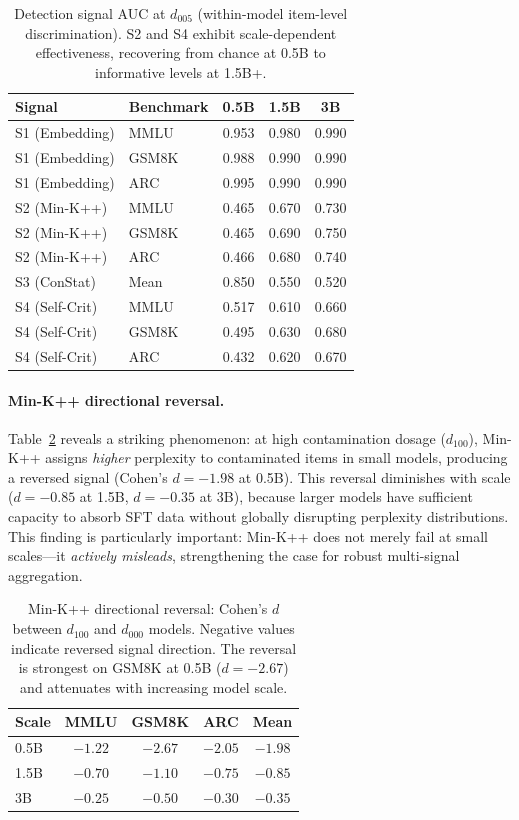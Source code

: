 \documentclass[11pt,a4paper]{article}
\begin{document}
\begin{table}[t]
\centering
\caption{Detection signal AUC at $d_{005}$ (within-model item-level discrimination). S2 and S4 exhibit scale-dependent effectiveness, recovering from chance at 0.5B to informative levels at 1.5B+.}
\label{tab:signal_auc}
\small
\begin{tabular}{llccc}
\toprule
Signal & Benchmark & 0.5B & 1.5B & 3B \\
\midrule
S1 (Embedding) & MMLU  & 0.953 & 0.980 & 0.990 \\
S1 (Embedding) & GSM8K & 0.988 & 0.990 & 0.990 \\
S1 (Embedding) & ARC   & 0.995 & 0.990 & 0.990 \\
\midrule
S2 (Min-K++)   & MMLU  & 0.465 & 0.670 & 0.730 \\
S2 (Min-K++)   & GSM8K & 0.465 & 0.690 & 0.750 \\
S2 (Min-K++)   & ARC   & 0.466 & 0.680 & 0.740 \\
\midrule
S3 (ConStat)   & Mean  & 0.850 & 0.550 & 0.520 \\
\midrule
S4 (Self-Crit) & MMLU  & 0.517 & 0.610 & 0.660 \\
S4 (Self-Crit) & GSM8K & 0.495 & 0.630 & 0.680 \\
S4 (Self-Crit) & ARC   & 0.432 & 0.620 & 0.670 \\
\bottomrule
\end{tabular}
\end{table}

\paragraph{Min-K++ directional reversal.}
Table~\ref{tab:minkpp_reversal} reveals a striking phenomenon: at high contamination dosage ($d_{100}$), Min-K++ assigns \emph{higher} perplexity to contaminated items in small models, producing a reversed signal (Cohen's $d=-1.98$ at 0.5B). This reversal diminishes with scale ($d=-0.85$ at 1.5B, $d=-0.35$ at 3B), because larger models have sufficient capacity to absorb SFT data without globally disrupting perplexity distributions. This finding is particularly important: Min-K++ does not merely fail at small scales---it \emph{actively misleads}, strengthening the case for robust multi-signal aggregation.

\begin{table}[t]
\centering
\caption{Min-K++ directional reversal: Cohen's $d$ between $d_{100}$ and $d_{000}$ models. Negative values indicate reversed signal direction. The reversal is strongest on GSM8K at 0.5B ($d=-2.67$) and attenuates with increasing model scale.}
\label{tab:minkpp_reversal}
\small
\begin{tabular}{lcccc}
\toprule
Scale & MMLU & GSM8K & ARC & Mean \\
\midrule
0.5B & $-1.22$ & $-2.67$ & $-2.05$ & $-1.98$ \\
1.5B & $-0.70$ & $-1.10$ & $-0.75$ & $-0.85$ \\
3B   & $-0.25$ & $-0.50$ & $-0.30$ & $-0.35$ \\
\bottomrule
\end{tabular}
\end{table}
\end{document}

